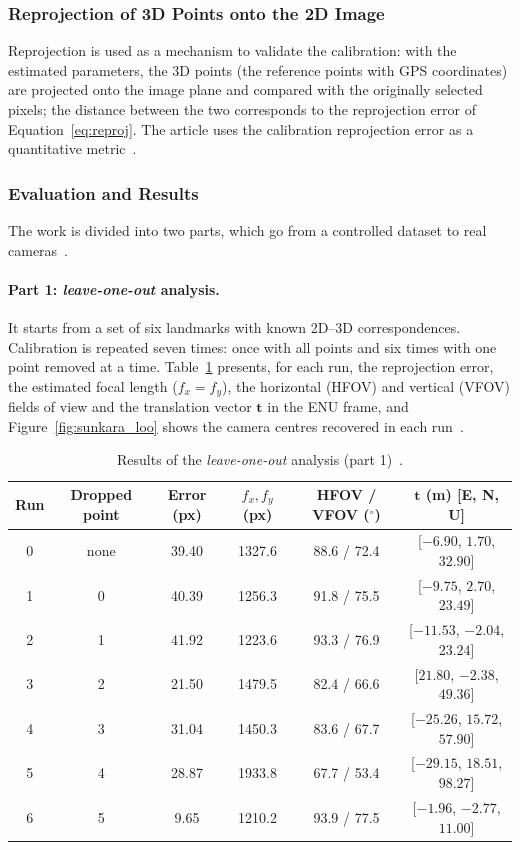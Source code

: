 \subsubsection{Reprojection of 3D Points onto the 2D Image}

Reprojection is used as a mechanism to validate the calibration: with the estimated parameters, the 3D points (the reference points with GPS coordinates) are projected onto the image plane and compared with the originally selected pixels; the distance between the two corresponds to the reprojection error of Equation~\eqref{eq:reproj}. The article uses the calibration reprojection error as a quantitative metric~\cite{sunkara2025}.

\subsubsection{Evaluation and Results}
\label{sec:sunkara_resultados}

The work is divided into two parts, which go from a controlled dataset to real cameras~\cite{sunkara2025}.

\paragraph{Part 1: \textit{leave-one-out} analysis.} It starts from a set of six landmarks with known 2D--3D correspondences. Calibration is repeated seven times: once with all points and six times with one point removed at a time. Table~\ref{tab:sunkara_loo} presents, for each run, the reprojection error, the estimated focal length ($f_x=f_y$), the horizontal (HFOV) and vertical (VFOV) fields of view and the translation vector $\mathbf{t}$ in the ENU frame, and Figure~\ref{fig:sunkara_loo} shows the camera centres recovered in each run~\cite{sunkara2025}.

\begin{table}[htbp]
\centering
\caption{Results of the \textit{leave-one-out} analysis (part 1)~\cite{sunkara2025}.}
\label{tab:sunkara_loo}
\small
\begin{tabular}{cccccc}
\hline
\textbf{Run} & \textbf{Dropped point} & \textbf{Error (px)} & \textbf{$f_x,f_y$ (px)} & \textbf{HFOV / VFOV ($^{\circ}$)} & \textbf{$\mathbf{t}$ (m) [E, N, U]} \\
\hline
0 & none & 39.40 & 1327.6 & 88.6 / 72.4 & [$-6.90$, $1.70$, $32.90$] \\
1 & 0 & 40.39 & 1256.3 & 91.8 / 75.5 & [$-9.75$, $2.70$, $23.49$] \\
2 & 1 & 41.92 & 1223.6 & 93.3 / 76.9 & [$-11.53$, $-2.04$, $23.24$] \\
3 & 2 & 21.50 & 1479.5 & 82.4 / 66.6 & [$21.80$, $-2.38$, $49.36$] \\
4 & 3 & 31.04 & 1450.3 & 83.6 / 67.7 & [$-25.26$, $15.72$, $57.90$] \\
5 & 4 & 28.87 & 1933.8 & 67.7 / 53.4 & [$-29.15$, $18.51$, $98.27$] \\
6 & 5 & 9.65 & 1210.2 & 93.9 / 77.5 & [$-1.96$, $-2.77$, $11.00$] \\
\hline
\end{tabular}
\end{table}

